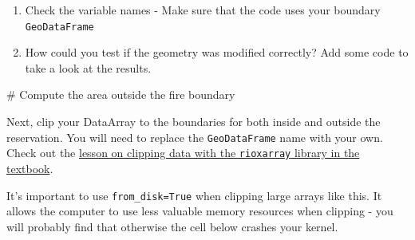\documentclass[
  letterpaper,
  DIV=11,
  numbers=noendperiod,
  oneside]{scrreprt}
\newenvironment{Shaded}{\begin{snugshade}}{\end{snugshade}}
\newcommand{\CommentTok}[1]{\textcolor[rgb]{0.37,0.37,0.37}{#1}}
\providecommand{\tightlist}{%
  \setlength{\itemsep}{0pt}\setlength{\parskip}{0pt}}
\begin{document}
\begin{tcolorbox}[enhanced jigsaw, colbacktitle=quarto-callout-color!10!white, opacityback=0, bottomtitle=1mm, toptitle=1mm, bottomrule=.15mm, left=2mm, colframe=quarto-callout-color-frame, leftrule=.75mm, opacitybacktitle=0.6, colback=white, rightrule=.15mm, toprule=.15mm, breakable, titlerule=0mm, title=\textcolor{quarto-callout-color}{\faInfo}\hspace{0.5em}{Try It}, coltitle=black, arc=.35mm]

\begin{enumerate}
\def\labelenumi{\arabic{enumi}.}
\tightlist
\item
  Check the variable names - Make sure that the code uses your boundary
  \texttt{GeoDataFrame}
\item
  How could you test if the geometry was modified correctly? Add some
  code to take a look at the results.
\end{enumerate}

\end{tcolorbox}

\begin{Shaded}
\begin{Highlighting}[]
\CommentTok{\# Compute the area outside the fire boundary}
\end{Highlighting}
\end{Shaded}

Next, clip your DataArray to the boundaries for both inside and outside
the reservation. You will need to replace the \texttt{GeoDataFrame} name
with your own. Check out the
\href{https://www.earthdatascience.org/courses/use-data-open-source-python/intro-raster-data-python/raster-data-processing/crop-raster-data-with-shapefile-in-python/}{lesson
on clipping data with the \texttt{rioxarray} library in the textbook}.

\begin{tcolorbox}[enhanced jigsaw, colbacktitle=quarto-callout-caution-color!10!white, opacityback=0, bottomtitle=1mm, toptitle=1mm, bottomrule=.15mm, left=2mm, colframe=quarto-callout-caution-color-frame, leftrule=.75mm, opacitybacktitle=0.6, colback=white, rightrule=.15mm, toprule=.15mm, breakable, titlerule=0mm, title=\textcolor{quarto-callout-caution-color}{\faFire}\hspace{0.5em}{GOTCHA ALERT}, coltitle=black, arc=.35mm]

It's important to use \texttt{from\_disk=True} when clipping large
arrays like this. It allows the computer to use less valuable memory
resources when clipping - you will probably find that otherwise the cell
below crashes your kernel.

\end{tcolorbox}
\end{document}
